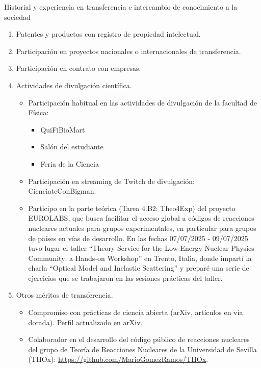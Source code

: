 \documentclass{resume2} %
\begin{document}
\begin{rSection}{Historial y experiencia en transferencia e intercambio de conocimiento a la sociedad}

\begin{enumerate}[label=\alph*.]

\item  Patentes y productos con registro de propiedad intelectual.

\item Participación en proyectos nacionales o internacionales de transferencia.

\item Participación en contrato con empresas.

\item Actividades de divulgación científica.

\begin{itemize}
\item Participaci\'on habitual en las actividades de divulgaci\'on de la facultad de F\'isica:
\begin{itemize}
\item QuiFiBioMart
\item Sal\'on del estudiante
\item Feria de la Ciencia
\end{itemize}

\item Participaci\'on en streaming de Twitch de divulgaci\'on: CienciateConBigman.

\item Participo en la parte te\'orica (Tarea 4.B2: Theo4Exp) del proyecto EUROLABS, que busca facilitar el acceso global a c\'odigos de reacciones nucleares actuales para grupos experimentales, en particular para grupos de pa\'ises en v\'ias de desarrollo. En las fechas 07/07/2025 - 09/07/2025 tuvo lugar el taller ``Theory Service for the Low Energy Nuclear Physics Community: a Hands-on Workshop'' en Trento, Italia, donde impart\'i la charla ``Optical Model and Inelastic Scattering'' y prepar\'e una serie de ejercicios que se trabajaron en las sesiones pr\'acticas del taller.

\end{itemize}

\item Otros méritos de transferencia.

\begin{itemize}
\item Compromiso con pr\'acticas de ciencia abierta (arXiv, art\'iculos en via dorada). Perfil actualizado en arXiv.
\item Colaborador en el desarrollo del c\'odigo p\'ublico de reacciones nucleares del grupo de Teor\'ia de Reacciones Nucleares de la Universidad de Sevilla (THOx): \url{https://github.com/MarioGomezRamos/THOx}.
\end{itemize}

\end{enumerate}
\end{rSection}
\end{document}
